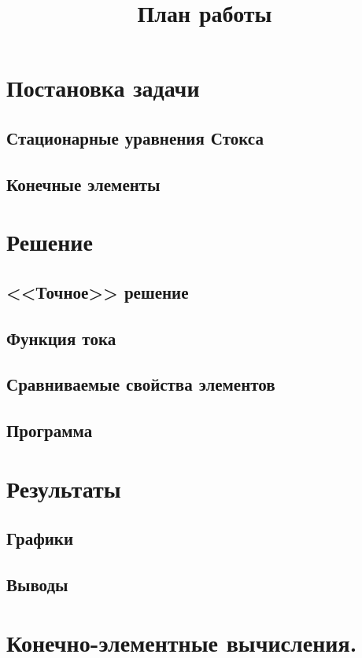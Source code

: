 \documentclass[12pt]{article}
\title{План работы}
\date{}
\author{}
\begin{document}
\section{Постановка задачи}
\subsection{Стационарные уравнения Стокса}
\subsection{Конечные элементы}

\section{Решение}
\subsection{<<Точное>> решение}
\subsection{Функция тока}
\subsection{Сравниваемые свойства элементов}
\subsection{Программа}

\section{Результаты}
\subsection{Графики}
\subsection{Выводы}

\section{Конечно-элементные вычисления.}
\end{document}
